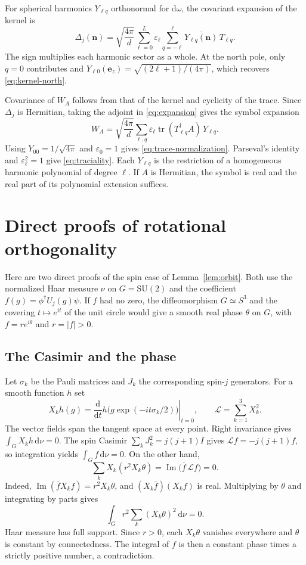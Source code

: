 \documentclass[11pt,a4paper]{article}
\DeclareMathOperator{\tr}{tr}
\newcommand{\SU}{\mathrm{SU}}
\newcommand{\dd}{\,\mathrm{d}}
\newcommand{\vn}{\mathbf n}
\begin{document}
For spherical harmonics \(Y_{\ell q}\) orthonormal for
\(\mathrm d\omega\), the covariant expansion of the kernel is
\cite[Eqs.~(A1)--(A2)]{davis2021}
\begin{equation}
  \Delta_j(\vn)=\sqrt{\frac{4\pi}{d}}\sum_{\ell=0}^{L}
  \varepsilon_\ell\sum_{q=-\ell}^{\ell}
    \overline{Y_{\ell q}(\vn)}\,T_{\ell q}.
  \label{eq:expansion}
\end{equation}
The sign multiplies each harmonic sector as a whole. At the north
pole, only \(q=0\) contributes and
\(Y_{\ell0}(\mathbf e_z)=\sqrt{(2\ell+1)/(4\pi)}\), which recovers
\eqref{eq:kernel-north}.

Covariance of \(W_A\) follows from that of the kernel and cyclicity
of the trace. Since \(\Delta_j\) is Hermitian, taking the adjoint in
\eqref{eq:expansion} gives the symbol expansion
\[
  W_A=\sqrt{\frac{4\pi}{d}}
      \sum_{\ell,q}\varepsilon_\ell
           \tr(T_{\ell q}^\dagger A)\,Y_{\ell q}.
\]
Using \(Y_{00}=1/\sqrt{4\pi}\) and \(\varepsilon_0=1\) gives
\eqref{eq:trace-normalization}. Parseval's identity and
\(\varepsilon_\ell^2=1\) give \eqref{eq:traciality}.
Each \(Y_{\ell q}\) is the restriction of a homogeneous harmonic
polynomial of degree \(\ell\). If \(A\) is Hermitian, the symbol
is real and the real part of its polynomial extension suffices.

\section{Direct proofs of rotational orthogonality}
\label{app:orbit}

Here are two direct proofs of the spin case of
Lemma~\ref{lem:orbit}. Both use the normalized Haar measure
\(\nu\) on \(G=\SU(2)\) and the coefficient
\(f(g)=\phi^\dagger U_j(g)\psi\). If \(f\) had no zero, the
diffeomorphism \(G\simeq S^3\) and the covering
\(t\mapsto e^{it}\) of the unit circle would give a smooth real
phase \(\theta\) on \(G\), with \(f=r e^{i\theta}\) and \(r=|f|>0\).

\subsection{The Casimir and the phase}

Let \(\sigma_k\) be the Pauli matrices and \(J_k\) the corresponding
spin-\(j\) generators. For a smooth function \(h\) set
\[
  X_kh(g)=\left.\frac{\mathrm d}{\mathrm dt}
     h\bigl(g\exp(-it\sigma_k/2)\bigr)\right|_{t=0},
  \qquad \mathcal L=\sum_{k=1}^3X_k^2.
\]
The vector fields span the tangent space at every point.
Right invariance gives \(\int_G X_kh\dd\nu=0\). The spin Casimir
\(\sum_k J_k^2=j(j+1)I\) gives \(\mathcal L f=-j(j+1)f\),
so integration yields \(\int_G f\dd\nu=0\). On the other hand,
\[
  \sum_k X_k(r^2X_k\theta)
  =\operatorname{Im}\bigl(\overline f\,\mathcal L f\bigr)=0 .
\]
Indeed, \(\operatorname{Im}(\overline f X_k f)=r^2X_k\theta\),
and \((X_k\overline f)(X_k f)\) is real. Multiplying by
\(\theta\) and integrating by parts gives
\[
  \int_G r^2\sum_k(X_k\theta)^2\dd\nu=0 .
\]
Haar measure has full support. Since \(r>0\), each \(X_k\theta\)
vanishes everywhere and \(\theta\) is constant by connectedness.
The integral of \(f\) is then a constant phase times a strictly
positive number, a contradiction.
\end{document}
